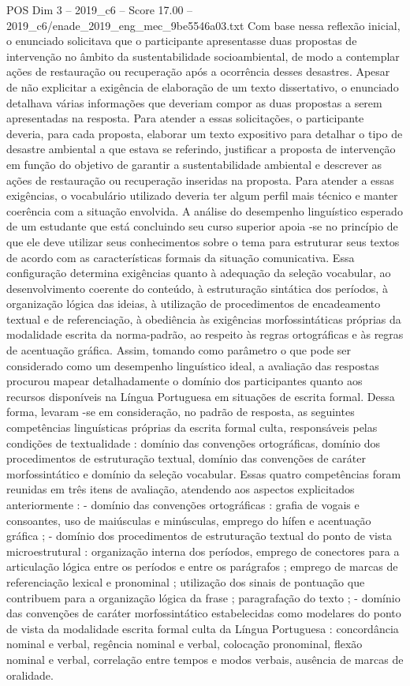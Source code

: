 \begin{textsample}{POS Dim 3 – 2019\_c6 – Score 17.00 – 2019\_c6/enade\_2019\_eng\_mec\_9be5546a03.txt}
Com base nessa reflexão inicial, o enunciado solicitava que o participante apresentasse duas propostas de intervenção no âmbito da sustentabilidade socioambiental, de modo a contemplar ações de restauração ou recuperação após a ocorrência desses desastres.
Apesar de não explicitar a exigência de elaboração de um texto dissertativo, o enunciado detalhava várias informações que deveriam compor as duas propostas a serem apresentadas na resposta.
Para atender a essas solicitações, o participante deveria, para cada proposta, elaborar um texto expositivo para detalhar o tipo de desastre ambiental a que estava se referindo, justificar a proposta de intervenção em função do objetivo de garantir a sustentabilidade ambiental e descrever as ações de restauração ou recuperação inseridas na proposta.
Para atender a essas exigências, o vocabulário utilizado deveria ter algum perfil mais técnico e manter coerência com a situação envolvida.
A análise do desempenho linguístico esperado de um estudante que está concluindo seu curso superior apoia -se no princípio de que ele deve utilizar seus conhecimentos sobre o tema para estruturar seus textos de acordo com as características formais da situação comunicativa.
Essa configuração determina exigências quanto à adequação da seleção vocabular, ao desenvolvimento coerente do conteúdo, à estruturação sintática dos períodos, à organização lógica das ideias, à utilização de procedimentos de encadeamento textual e de referenciação, à obediência às exigências morfossintáticas próprias da modalidade escrita da norma-padrão, ao respeito às regras ortográficas e às regras de acentuação gráfica.
Assim, tomando como parâmetro o que pode ser considerado como um desempenho linguístico ideal, a avaliação das respostas procurou mapear detalhadamente o domínio dos participantes quanto aos recursos disponíveis na Língua Portuguesa em situações de escrita formal.
Dessa forma, levaram -se em consideração, no padrão de resposta, as seguintes competências linguísticas próprias da escrita formal culta, responsáveis pelas condições de textualidade : domínio das convenções ortográficas, domínio dos procedimentos de estruturação textual, domínio das convenções de caráter morfossintático e domínio da seleção vocabular.
Essas quatro competências foram reunidas em três itens de avaliação, atendendo aos aspectos explicitados anteriormente : - domínio das convenções ortográficas : grafia de vogais e consoantes, uso de maiúsculas e minúsculas, emprego do hífen e acentuação gráfica ; - domínio dos procedimentos de estruturação textual do ponto de vista microestrutural : organização interna dos períodos, emprego de conectores para a articulação lógica entre os períodos e entre os parágrafos ; emprego de marcas de referenciação lexical e pronominal ; utilização dos sinais de pontuação que contribuem para a organização lógica da frase ; paragrafação do texto ; - domínio das convenções de caráter morfossintático estabelecidas como modelares do ponto de vista da modalidade escrita formal culta da Língua Portuguesa : concordância nominal e verbal, regência nominal e verbal, colocação pronominal, flexão nominal e verbal, correlação entre tempos e modos verbais, ausência de marcas de oralidade.

\end{textsample}

